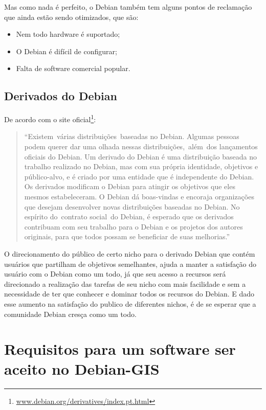 Mas como nada é perfeito, o Debian também tem alguns pontos de reclamação que ainda estão sendo otimizados, que são:

\begin{itemize}
	\item Nem todo hardware é suportado;
	\item O Debian é difícil de configurar;
	\item Falta de software comercial popular.

\end{itemize}

\subsection{Derivados do Debian}

De acordo com o site oficial\footnote{\url{www.debian.org/derivatives/index.pt.html}}: 

\begin{quote}
	``Existem várias distribuições baseadas no Debian. Algumas pessoas podem querer dar uma olhada nessas distribuições, além dos lançamentos oficiais do Debian. Um derivado do Debian é uma distribuição baseada no trabalho realizado no Debian, mas com sua própria identidade, objetivos e público-alvo, e é criado por uma entidade que é independente do Debian. Os derivados modificam o Debian para atingir os objetivos que eles mesmos estabeleceram. O Debian dá boas-vindas e encoraja organizações que desejam desenvolver novas distribuições baseadas no Debian. No espírito do contrato social do Debian, é esperado que os derivados contribuam com seu trabalho para o Debian e os projetos dos autores originais, para que todos possam se beneficiar de suas melhorias.''
\end{quote}

O direcionamento do público de certo nicho para o derivado Debian que contém usuários que partilham de objetivos semelhantes, ajuda a manter a satisfação do usuário com o Debian como um todo, já que seu acesso a recursos será direcionado a realização das tarefas de seu nicho com mais facilidade e sem a necessidade de ter que conhecer e dominar todos os recursos do Debian. E dado esse aumento na satisfação do publico de diferentes nichos, é de se esperar que a comunidade Debian cresça como um todo.

\section{Requisitos para um software ser aceito no Debian-GIS}

